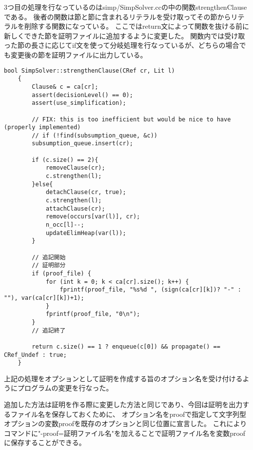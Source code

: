 3つ目の処理を行なっているのはsimp/SimpSolver.ccの中の関数strengthenClauseである。
後者の関数は節と節に含まれるリテラルを受け取ってその節からリテラルを削除する関数になっている。
ここではreturn文によって関数を抜ける前に新しくできた節を証明ファイルに追加するように変更した。
関数内では受け取った節の長さに応じてif文を使って分岐処理を行なっているが、どちらの場合でも変更後の節を証明ファイルに出力している。
\begin{lstlisting}[caption=関数strengthenClauseの変更(simp/SimpSolver.cc), firstnumber=203]
    bool SimpSolver::strengthenClause(CRef cr, Lit l)
    {
        Clause& c = ca[cr];
        assert(decisionLevel() == 0);
        assert(use_simplification);

        // FIX: this is too inefficient but would be nice to have (properly implemented)
        // if (!find(subsumption_queue, &c))
        subsumption_queue.insert(cr);

        if (c.size() == 2){
            removeClause(cr);
            c.strengthen(l);
        }else{
            detachClause(cr, true);
            c.strengthen(l);
            attachClause(cr);
            remove(occurs[var(l)], cr);
            n_occ[l]--;
            updateElimHeap(var(l));
        }

        // 追記開始
        // 証明部分
        if (proof_file) {
            for (int k = 0; k < ca[cr].size(); k++) {
                fprintf(proof_file, "%s%d ", (sign(ca[cr][k])? "-" : ""), var(ca[cr][k])+1);
            }
            fprintf(proof_file, "0\n");
        }
        // 追記終了

        return c.size() == 1 ? enqueue(c[0]) && propagate() == CRef_Undef : true;
    }
\end{lstlisting}

上記の処理をオプションとして証明を作成する旨のオプション名を受け付けるようにプログラムの変更を行なった。

追加した方法は証明を作る際に変更した方法と同じであり、今回は証明を出力するファイル名を保存しておくために、
オプション名をproofで指定して文字列型オプションの変数proofを既存のオプションと同じ位置に宣言した。
これによりコマンドに"-proof=証明ファイル名"を加えることで証明ファイル名を変数proofに保存することができる。

